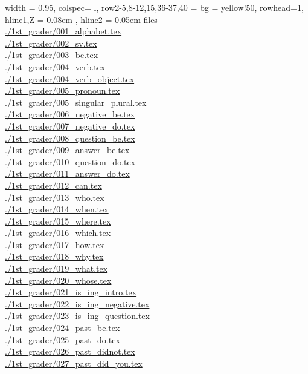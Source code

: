 \documentclass[book,jafontscale=0.9247]{jlreq}
\begin{document}
\newpage
\scriptsize
\begin{longtblr}[caption={Enflish Slides}]{
  width = { 0.95\linewidth },
  colspec= {l},
  row{2-5,8-12,15,36-37,40} = {bg = yellow!50},
  rowhead=1,
  hline{1,Z} = { 0.08em }, %
  hline{2} = { 0.05em } %
}
files\\
\url{./1st_grader/001_alphabet.tex}\\
\url{./1st_grader/002_sv.tex}\\
\url{./1st_grader/003_be.tex}\\
\url{./1st_grader/004_verb.tex}\\
\url{./1st_grader/004_verb_object.tex}\\
\url{./1st_grader/005_pronoun.tex}\\
\url{./1st_grader/005_singular_plural.tex}\\
\url{./1st_grader/006_negative_be.tex}\\
\url{./1st_grader/007_negative_do.tex}\\
\url{./1st_grader/008_question_be.tex}\\
\url{./1st_grader/009_answer_be.tex}\\
\url{./1st_grader/010_question_do.tex}\\
\url{./1st_grader/011_answer_do.tex}\\
\url{./1st_grader/012_can.tex}\\
\url{./1st_grader/013_who.tex}\\
\url{./1st_grader/014_when.tex}\\
\url{./1st_grader/015_where.tex}\\
\url{./1st_grader/016_which.tex}\\
\url{./1st_grader/017_how.tex}\\
\url{./1st_grader/018_why.tex}\\
\url{./1st_grader/019_what.tex}\\
\url{./1st_grader/020_whose.tex}\\
\url{./1st_grader/021_is_ing_intro.tex}\\
\url{./1st_grader/022_is_ing_negative.tex}\\
\url{./1st_grader/023_is_ing_question.tex}\\
\url{./1st_grader/024_past_be.tex}\\
\url{./1st_grader/025_past_do.tex}\\
\url{./1st_grader/026_past_didnot.tex}\\
\url{./1st_grader/027_past_did_you.tex}\\

\end{longtblr}
\end{document}
